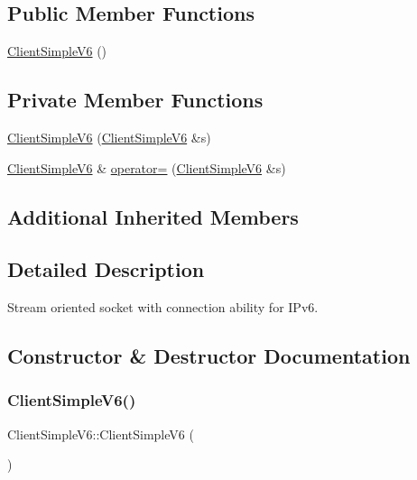 \subsection*{Public Member Functions}
\begin{DoxyCompactItemize}
\item 
\hyperlink{classClientSimpleV6_a9e064f9b3c0b4b33f92b14c4eb8f5ac4}{Client\+Simple\+V6} ()
\end{DoxyCompactItemize}
\subsection*{Private Member Functions}
\begin{DoxyCompactItemize}
\item 
\hyperlink{classClientSimpleV6_a11b2623f14326d304d9679f04499bea2}{Client\+Simple\+V6} (\hyperlink{classClientSimpleV6}{Client\+Simple\+V6} \&s)
\item 
\hyperlink{classClientSimpleV6}{Client\+Simple\+V6} \& \hyperlink{classClientSimpleV6_a9ca646eeda4e4d5670c0eb70b915d3e4}{operator=} (\hyperlink{classClientSimpleV6}{Client\+Simple\+V6} \&s)
\end{DoxyCompactItemize}
\subsection*{Additional Inherited Members}


\subsection{Detailed Description}
Stream oriented socket with connection ability for I\+Pv6. 

\subsection{Constructor \& Destructor Documentation}
\mbox{\label{classClientSimpleV6_a9e064f9b3c0b4b33f92b14c4eb8f5ac4}} 
\subsubsection{\texorpdfstring{Client\+Simple\+V6()}{ClientSimpleV6()}\hspace{0.1cm}{\footnotesize\ttfamily [1/2]}}
{\footnotesize\ttfamily Client\+Simple\+V6\+::\+Client\+Simple\+V6 (\begin{DoxyParamCaption}{ }\end{DoxyParamCaption})\hspace{0.3cm}{\ttfamily [inline]}}

